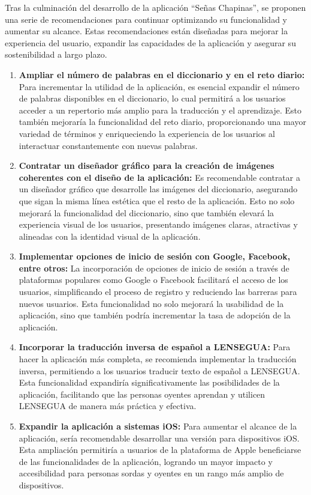 
Tras la culminación del desarrollo de la aplicación ``Señas Chapinas'', se proponen una serie de recomendaciones para continuar optimizando su funcionalidad y aumentar su alcance. Estas recomendaciones están diseñadas para mejorar la experiencia del usuario, expandir las capacidades de la aplicación y asegurar su sostenibilidad a largo plazo.

\begin{enumerate}
    \item \textbf{Ampliar el número de palabras en el diccionario y en el reto diario:} 
    Para incrementar la utilidad de la aplicación, es esencial expandir el número de palabras disponibles en el diccionario, lo cual permitirá a los usuarios acceder a un repertorio más amplio para la traducción y el aprendizaje. Esto también mejoraría la funcionalidad del reto diario, proporcionando una mayor variedad de términos y enriqueciendo la experiencia de los usuarios al interactuar constantemente con nuevas palabras.

    \item \textbf{Contratar un diseñador gráfico para la creación de imágenes coherentes con el diseño de la aplicación:} 
    Es recomendable contratar a un diseñador gráfico que desarrolle las imágenes del diccionario, asegurando que sigan la misma línea estética que el resto de la aplicación. Esto no solo mejorará la funcionalidad del diccionario, sino que también elevará la experiencia visual de los usuarios, presentando imágenes claras, atractivas y alineadas con la identidad visual de la aplicación.

    \item \textbf{Implementar opciones de inicio de sesión con Google, Facebook, entre otros:} 
    La incorporación de opciones de inicio de sesión a través de plataformas populares como Google o Facebook facilitará el acceso de los usuarios, simplificando el proceso de registro y reduciendo las barreras para nuevos usuarios. Esta funcionalidad no solo mejorará la usabilidad de la aplicación, sino que también podría incrementar la tasa de adopción de la aplicación.

    \item \textbf{Incorporar la traducción inversa de español a LENSEGUA:} 
    Para hacer la aplicación más completa, se recomienda implementar la traducción inversa, permitiendo a los usuarios traducir texto de español a LENSEGUA. Esta funcionalidad expandiría significativamente las posibilidades de la aplicación, facilitando que las personas oyentes aprendan y utilicen LENSEGUA de manera más práctica y efectiva.

    \item \textbf{Expandir la aplicación a sistemas iOS:} 
    Para aumentar el alcance de la aplicación, sería recomendable desarrollar una versión para dispositivos iOS. Esta ampliación permitiría a usuarios de la plataforma de Apple beneficiarse de las funcionalidades de la aplicación, logrando un mayor impacto y accesibilidad para personas sordas y oyentes en un rango más amplio de dispositivos.
\end{enumerate}
